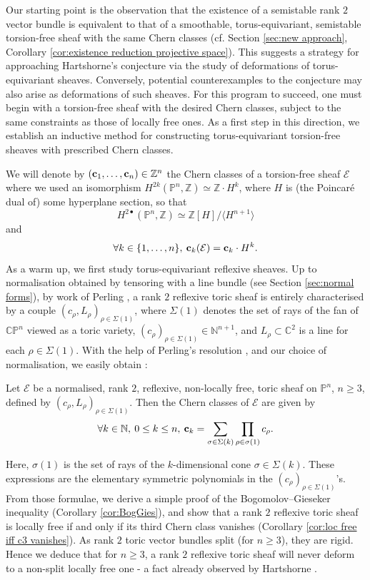 \documentclass[a4paper,10pt]{amsart}
\theoremstyle{plain}{
    \newtheorem{theorem}{Theorem}[section]
    \newtheorem{lemma}[theorem]{Lemma}
    \newtheorem{corollary}[theorem]{Corollary}
    \newtheorem{proposition}[theorem]{Proposition}
    \newtheorem{conjecture}[theorem]{Conjecture}
}
\theoremstyle{definition}{
    \newtheorem{definition}[theorem]{Definition}
    \newtheorem{defn-thm}[theorem]{Definition-Theorem}
    \newtheorem{example}[theorem]{Example}
    \newtheorem{notation}[theorem]{Notation}
}
\theoremstyle{remark}{
    \newtheorem{remark}[theorem]{Remark}
    \newtheorem{problem}[theorem]{Problem}
    \newtheorem{question}[theorem]{Question}
}
\def\uc{{\bf c}}
\def\cE{\mathcal{E}}
\def\Z{\mathbb{Z}}
\def\N{\mathbb{N}}
\def\P{\mathbb{P}}
\def\C{\mathbb{C}}
\begin{document}
Our starting point is the observation that the existence of a semistable rank $2$ vector bundle is equivalent to that of a smoothable, torus-equivariant, semistable torsion-free sheaf with the same Chern classes (cf. Section \ref{sec:new approach}, Corollary \ref{cor:existence reduction projective space}). This suggests a strategy for approaching Hartshorne's conjecture via the study of deformations of torus-equivariant sheaves. Conversely, potential counterexamples to the conjecture may also arise as deformations of such sheaves. For this program to succeed, one must begin with a torsion-free sheaf with the desired Chern classes, subject to the same constraints as those of locally free ones. As a first step in this direction, we establish an inductive method for constructing torus-equivariant torsion-free sheaves with prescribed Chern classes.

We will denote by $(\uc_1,\ldots,\uc_n)\in \Z^n$ the Chern classes of a torsion-free sheaf $\cE$ where we used an isomorphism $H^{2k}(\P^n,\Z)\simeq \Z\cdot H^k$, where $H$ is (the Poincar\'e dual of) some hyperplane section, so that
$$
H^{2\bullet}(\P^n,\Z)\simeq \Z[H]/\langle H^{n+1}\rangle
$$
and 
$$
\forall k\in\lbrace 1,\ldots,n\rbrace,\: \uc_k(\cE)=\uc_k\cdot H^k.
$$
As a warm up, we first study torus-equivariant reflexive sheaves. Up to normalisation obtained by tensoring with a line bundle (see Section \ref{sec:normal forms}), by work of Perling \cite{Per04}, a rank $2$ reflexive toric sheaf  is entirely characterised by a couple $(c_\rho,L_\rho)_{\rho\in\Sigma(1)}$, where $\Sigma(1)$ denotes the set of rays of the fan of $\C\P^n$ viewed as a toric variety, $(c_\rho)_{\rho\in\Sigma(1)}\in\N^{n+1}$, and $L_\rho\subset \C^2$ is a line for each $\rho\in\Sigma(1)$. With the help of Perling's resolution \cite{Per03}, and our choice of normalisation, we easily obtain :
\begin{proposition}
 \label{prop:intro chern classes reflexive case}
Let $\cE$ be a normalised, rank $2$, reflexive, non-locally free, toric sheaf on $\P^n$, $n\geq 3$, defined by $(c_\rho,L_\rho)_{\rho\in\Sigma(1)}$. Then the Chern classes of $\cE$ are given by
\begin{equation}
 \label{eq:intro chern formulae}
\forall k\in\N,\:  0\leq k\leq n,\:\uc_k=\sum_{\sigma\in\Sigma(k)} \prod_{\rho\in\sigma(1)}c_\rho.
\end{equation}
\end{proposition}
Here, $\sigma(1)$ is the set of rays of the $k$-dimensional cone $\sigma\in\Sigma(k)$. These expressions are  the elementary symmetric polynomials in the $(c_\rho)_{\rho\in\Sigma(1)}$'s.  From those formulae, we derive a simple proof of the Bogomolov--Gieseker inequality (Corollary \ref{cor:BogGies}), and show that a rank $2$ reflexive toric sheaf is locally free if and only if its third Chern class vanishes (Corollary \ref{cor:loc free iff c3 vanishes}). As rank $2$ toric vector bundles split (for $n\geq 3$), they are rigid. Hence we deduce that for $n\geq 3$, a rank $2$ reflexive toric sheaf will never deform to a non-split locally free one - a fact already observed by Hartshorne \cite[Introduction]{Har80}.
\end{document}
